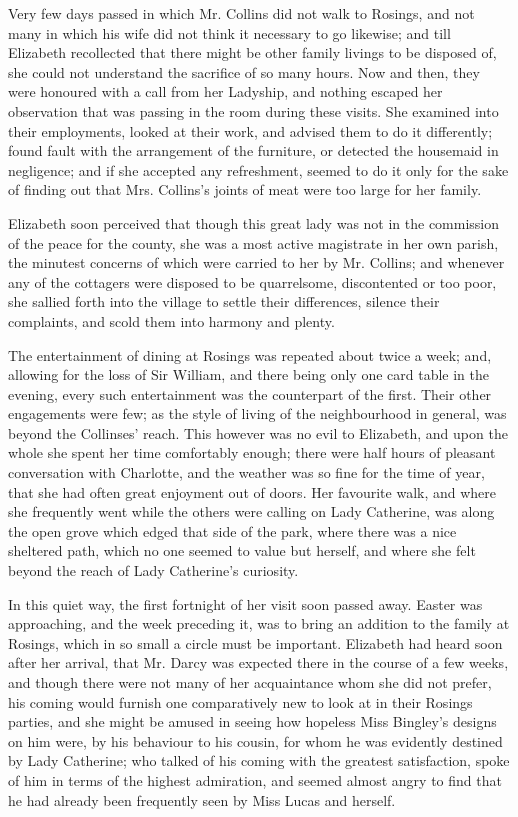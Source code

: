 Very few days passed in which Mr. Collins did not walk
to Rosings, and not many in which his wife did not think
it necessary to go likewise; and till Elizabeth recollected
that there might be other family livings to be disposed of,
she could not understand the sacrifice of so many hours.
Now and then, they were honoured with a call from her
Ladyship, and nothing escaped her observation that was
passing in the room during these visits. She examined
into their employments, looked at their work, and advised
them to do it differently; found fault with the arrangement
of the furniture, or detected the housemaid in
negligence; and if she accepted any refreshment, seemed
to do it only for the sake of finding out that Mrs. Collins’s
joints of meat were too large for her family.

Elizabeth soon perceived that though this great lady
was not in the commission of the peace for the county,
she was a most active magistrate in her own parish, the
minutest concerns of which were carried to her by Mr.
Collins; and whenever any of the cottagers were disposed
to be quarrelsome, discontented or too poor, she sallied
forth into the village to settle their differences, silence
their complaints, and scold them into harmony and plenty.

The entertainment of dining at Rosings was repeated
about twice a week; and, allowing for the loss of Sir
William, and there being only one card table in the
evening, every such entertainment was the counterpart
of the first. Their other engagements were few; as the
style of living of the neighbourhood in general, was
beyond the Collinses’ reach. This however was no evil
to Elizabeth, and upon the whole she spent her time
comfortably enough; there were half hours of pleasant
conversation with Charlotte, and the weather was so fine
for the time of year, that she had often great enjoyment
out of doors. Her favourite walk, and where she frequently
went while the others were calling on Lady
Catherine, was along the open grove which edged that
side of the park, where there was a nice sheltered path,
which no one seemed to value but herself, and where she
felt beyond the reach of Lady Catherine’s curiosity.

In this quiet way, the first fortnight of her visit soon
passed away. Easter was approaching, and the week
preceding it, was to bring an addition to the family at
Rosings, which in so small a circle must be important.
Elizabeth had heard soon after her arrival, that Mr. Darcy
was expected there in the course of a few weeks, and
though there were not many of her acquaintance whom
she did not prefer, his coming would furnish one comparatively
new to look at in their Rosings parties, and she
might be amused in seeing how hopeless Miss Bingley’s
designs on him were, by his behaviour to his cousin, for
whom he was evidently destined by Lady Catherine;
who talked of his coming with the greatest satisfaction,
spoke of him in terms of the highest admiration, and
seemed almost angry to find that he had already been
frequently seen by Miss Lucas and herself.

